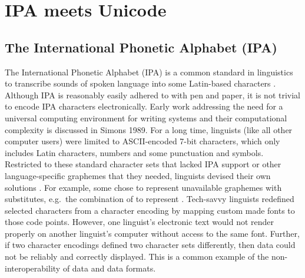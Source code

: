 \chapter{IPA meets Unicode}
\label{ipa-meets-unicode}

\section{The International Phonetic Alphabet (IPA)}
\label{the-international-phonetic-alphabet}

The International Phonetic Alphabet (IPA) is a common standard in linguistics to
transcribe sounds of spoken language into some Latin-based characters
\citep{IPA2005}. Although IPA is reasonably easily adhered to with pen and
paper, it is not trivial to encode IPA characters electronically. Early work
addressing the need for a universal computing environment for writing systems
and their computational complexity is discussed in Simons 1989. For a long time,
linguists (like all other computer users) were limited to ASCII-encoded 7-bit
characters, which only includes Latin characters, numbers and some punctuation
and symbols. Restricted to these standard character sets that lacked IPA support
or other language-specific graphemes that they needed, linguists devised their
own solutions \citep{BirdSimons2003}. For example, some chose to represent
unavailable graphemes with substitutes, e.g.~the combination of to represent .
Tech-savvy linguists redefined selected characters from a character encoding by
mapping custom made fonts to those code points. However, one linguist's
electronic text would not render properly on another linguist's computer without
access to the same font. Further, if two character encodings defined two
character sets differently, then data could not be reliably and correctly
displayed. This is a common example of the non-interoperability of data and data
formats.

